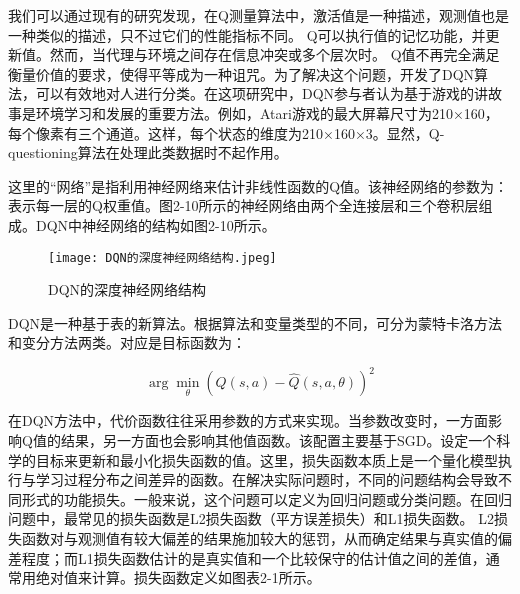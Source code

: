 
我们可以通过现有的研究发现，在Q测量算法中，激活值是一种描述，观测值也是一种类似的描述，只不过它们的性能指标不同。 Q可以执行值的记忆功能，并更新值。然而，当代理与环境之间存在信息冲突或多个层次时。 Q值不再完全满足衡量价值的要求，使得平等成为一种诅咒。为了解决这个问题，开发了DQN算法，可以有效地对人进行分类。在这项研究中，DQN参与者认为基于游戏的讲故事是环境学习和发展的重要方法。例如，Atari游戏的最大屏幕尺寸为210×160，每个像素有三个通道。这样，每个状态的维度为210×160×3。显然，Q-questioning算法在处理此类数据时不起作用。

这里的“网络”是指利用神经网络来估计非线性函数的Q值。该神经网络的参数为： 表示每一层的Q权重值。图2-10所示的神经网络由两个全连接层和三个卷积层组成。DQN中神经网络的结构如图2-10所示。

\begin{figure}[hbt]
	\centering
	\texttt{[image: DQN的深度神经网络结构.jpeg]}
	\caption{DQN的深度神经网络结构}
	\label{f.example}
\end{figure}

DQN是一种基于表的新算法。根据算法和变量类型的不同，可分为蒙特卡洛方法和变分方法两类。对应是目标函数为：

\begin{equation}
	\arg\min_{\theta} \left( Q(s,a) - \hat{Q}(s,a,\theta) \right)^2
\end{equation}

在DQN方法中，代价函数往往采用参数的方式来实现。当参数改变时，一方面影响Q值的结果，另一方面也会影响其他值函数。该配置主要基于SGD\cite{wankhadedeep}。设定一个科学的目标来更新和最小化损失函数的值。这里，损失函数本质上是一个量化模型执行与学习过程分布之间差异的函数。在解决实际问题时，不同的问题结构会导致不同形式的功能损失。一般来说，这个问题可以定义为回归问题或分类问题。在回归问题中，最常见的损失函数是L2损失函数（平方误差损失）和L1损失函数。 L2损失函数对与观测值有较大偏差的结果施加较大的惩罚，从而确定结果与真实值的偏差程度；而L1损失函数估计的是真实值和一个比较保守的估计值之间的差值，通常用绝对值来计算。损失函数定义如图表2-1所示。

